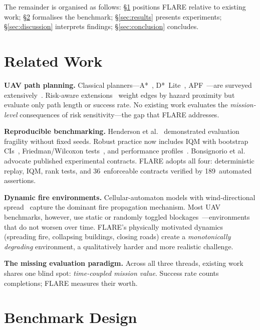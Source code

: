 \documentclass[conference]{IEEEtran}
\begin{document}
The remainder is organised as follows: \S\ref{sec:related} positions FLARE
relative to existing work; \S\ref{sec:design} formalises the benchmark;
\S\ref{sec:results} presents experiments; \S\ref{sec:discussion} interprets
findings; \S\ref{sec:conclusion} concludes.

\section{Related Work}\label{sec:related}

\textbf{UAV path planning.} Classical planners---A*~\cite{Hart1968},
D*~Lite~\cite{Koenig2002}, APF~\cite{Khatib1986}---are surveyed
extensively~\cite{Meng2025,Dradoum2025,Aggarwal2020}. Risk-aware
extensions~\cite{Zhou2025,Melissaris2025} weight edges by hazard proximity
but evaluate only path length or success rate. No existing work evaluates
the \emph{mission-level} consequences of risk sensitivity---the gap that
FLARE addresses.

\textbf{Reproducible benchmarking.}
Henderson et al.~\cite{Henderson2018} demonstrated evaluation fragility
without fixed seeds. Robust practice now includes IQM with bootstrap
CIs~\cite{Agarwal2021}, Friedman/Wilcoxon tests~\cite{Demsar2006}, and
performance profiles~\cite{Dolan2002}. Bonsignorio et
al.~\cite{Bonsignorio2025} advocate published experimental contracts.
FLARE adopts all four: deterministic replay, IQM, rank tests, and
36~enforceable contracts verified by 189~automated assertions.

\textbf{Dynamic fire environments.} Cellular-automaton models with
wind-directional spread~\cite{Alexandridis2008,Giannino2025,Sahila2025}
capture the dominant fire propagation mechanism. Most UAV benchmarks,
however, use static or randomly toggled
blockages~\cite{Zhao2020}---environments that do not worsen over time.
FLARE's physically motivated dynamics (spreading fire, collapsing
buildings, closing roads) create a \emph{monotonically degrading}
environment, a qualitatively harder and more realistic challenge.

\textbf{The missing evaluation paradigm.} Across all three threads,
existing work shares one blind spot: \emph{time-coupled mission value}.
Success rate counts completions; FLARE measures their worth.

\section{Benchmark Design}\label{sec:design}
\end{document}

